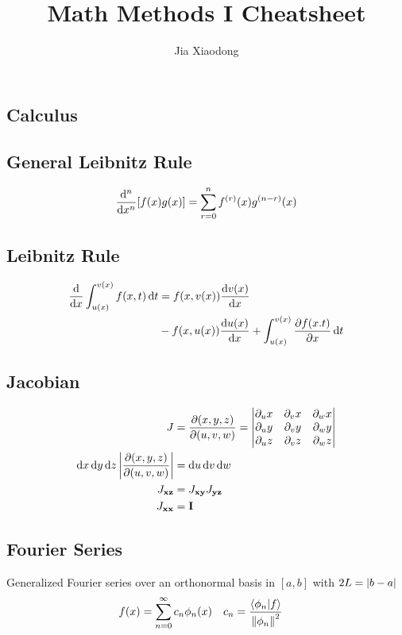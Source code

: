 \documentclass[8pt]{extarticle}
\author{Jia Xiaodong}
\title{Math Methods I Cheatsheet}
\begin{document}
\begin{multicols*}{3}
\section{Calculus}
\subsection{General Leibnitz Rule}
\begin{equation*}
    \dv[n]{}{x}[f(x)g(x)] = \sum_{r=0}^n f^{(r)}(x)g^{(n-r)}(x)
\end{equation*}
\subsection{Leibnitz Rule}
\begin{align*}
    \dv{}{x}\int_{u(x)}^{v(x)}f(x,t)\dd{t} &= f(x,v(x))\dv{v(x)}{x} \\
    &- f(x,u(x))\dv{u(x)}{x} + \int_{u(x)}^{v(x)}
    \pdv{f(x.t)}{x} \dd{t}
\end{align*}

\subsection{Jacobian}
\begin{align*}
    J &= \pdv{(x,y,z)}{(u,v,w)} =
    \begin{vmatrix}
        \partial_{u}x & \partial_{v}x & \partial_{w}x \\
        \partial_{u}y & \partial_{v}y & \partial_{w}y \\
        \partial_{u}z & \partial_{v}z & \partial_{w}z \\
\end{vmatrix} \\
    \dd{x}\dd{y}\dd{z} \abs{\pdv{(x,y,z)}{(u,v,w)}} &= \dd{u}\dd{v}\dd{w} \\
    J_{\mathbf{xz}} &= J_{\mathbf{xy}}J_{\mathbf{yz}} \\
    J_{\mathbf{xx}} &= \mathbf{I}
\end{align*}

\subsection{Fourier Series}
Generalized Fourier series over an orthonormal basis in $[a,b]$ with $2L =
\abs{b-a}$
\begin{align*}
    f(x) &= \sum_{n=0}^\infty c_n \phi_n(x) &
    c_n &= \frac{\braket{\phi_n}{f}}{\norm{\phi_n}^2} &
\end{align*}


\end{multicols*}
\end{document}
